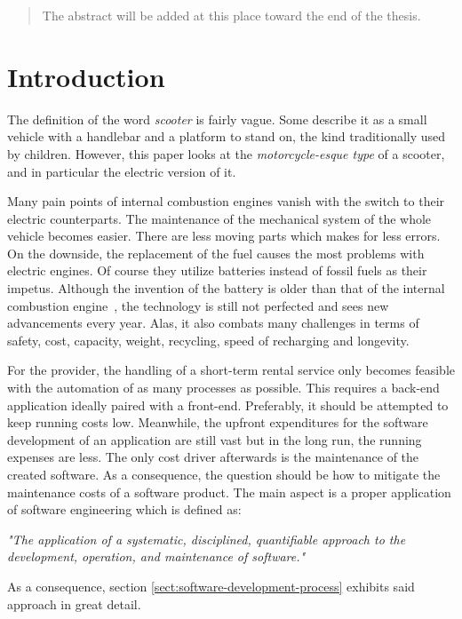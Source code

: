 \documentclass[12pt,a4paper,twoside]{report}
\begin{document}



\begin{abstract}

The abstract will be added at this place toward the end of the thesis.

\end{abstract}



\tableofcontents



\chapter{Introduction} \label{chap:intro}



The definition of the word \emph{scooter} is fairly vague.
Some describe it as a small vehicle with a handlebar and a platform to stand on,
the kind traditionally used by children.
However, this paper looks at the \emph{motorcycle-esque type} of a scooter, and in
particular the electric version of it.

Many pain points of internal combustion engines vanish with the switch to their electric
counterparts. The maintenance of the mechanical system of the whole vehicle becomes easier.
There are less moving parts which makes for less errors.
On the downside, the replacement of the fuel causes the most problems with electric engines.
Of course they utilize batteries instead of fossil fuels as their impetus.
Although the invention of the battery is older than that of the
internal combustion engine~\cite{battery, combustion-engine}, the technology is still not perfected and sees new
advancements every year. Alas, it also combats many challenges in terms of
safety, cost, capacity, weight, recycling, speed of recharging and longevity.

For the provider, the handling of a short-term rental service
only becomes feasible with the automation of as many processes as possible.
This requires a back-end application ideally paired with a front-end.
Preferably, it should be attempted to keep running costs low.
Meanwhile, the upfront expenditures for the software development of
an application are still vast but in the long run, the running expenses are less.
The only cost driver afterwards is the maintenance of the created software.
As a consequence, the question should be how to mitigate the maintenance costs
of a software product. The main aspect is a proper application of
software engineering which is defined as:
\begin{displayquote}
\emph{"The application of a systematic, disciplined, quantifiable approach to the
development, operation, and maintenance of software."}~\cite{se-ieee}
\end{displayquote}
As a consequence, section \ref{sect:software-development-process} exhibits
said approach in great detail.
\end{document}
